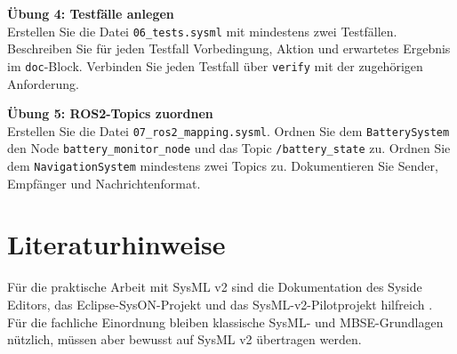 \begin{uebungbox}
\textbf{Übung 4: Testfälle anlegen}\\
Erstellen Sie die Datei \texttt{06\_tests.sysml} mit mindestens zwei Testfällen. Beschreiben Sie für jeden Testfall Vorbedingung, Aktion und erwartetes Ergebnis im \texttt{doc}-Block. Verbinden Sie jeden Testfall über \texttt{verify} mit der zugehörigen Anforderung.
\end{uebungbox}

\begin{uebungbox}
\textbf{Übung 5: ROS2-Topics zuordnen}\\
Erstellen Sie die Datei \texttt{07\_ros2\_mapping.sysml}. Ordnen Sie dem \texttt{BatterySystem} den Node \texttt{battery\_monitor\_node} und das Topic \texttt{/battery\_state} zu. Ordnen Sie dem \texttt{NavigationSystem} mindestens zwei Topics zu. Dokumentieren Sie Sender, Empfänger und Nachrichtenformat.
\end{uebungbox}

\section{Literaturhinweise}
Für die praktische Arbeit mit SysML v2 sind die Dokumentation des Syside Editors, das Eclipse-SysON-Projekt und das SysML-v2-Pilotprojekt hilfreich \cite{syside,syson,sysmlv2pilot}. Für die fachliche Einordnung bleiben klassische SysML- und MBSE-Grundlagen nützlich, müssen aber bewusst auf SysML v2 übertragen werden.
